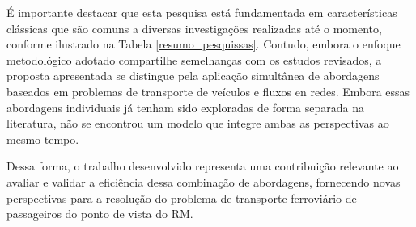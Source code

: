 É importante destacar que esta pesquisa está fundamentada em características clássicas que são comuns a diversas investigações realizadas até o momento, conforme ilustrado na Tabela  \ref{resumo_pesquissas}. Contudo, embora o enfoque metodológico adotado compartilhe semelhanças com os estudos revisados, a proposta apresentada se distingue pela aplicação simultânea de abordagens baseados em problemas de transporte de veículos e fluxos en redes. Embora essas abordagens individuais já tenham sido exploradas de forma separada na literatura, não se encontrou um modelo que integre ambas as perspectivas ao mesmo tempo. 




Dessa forma, o trabalho desenvolvido representa uma contribuição relevante ao avaliar e validar a eficiência dessa combinação de abordagens, fornecendo novas perspectivas para a resolução do problema de transporte ferroviário de passageiros do ponto de vista do RM.